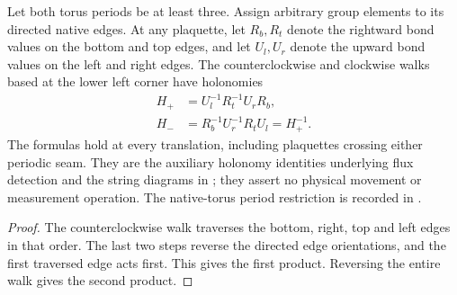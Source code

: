 \begin{lemma}%
    \label{thm:peps_torus_plaquette_holonomy}
    \leanok
    Let both torus periods be at least three. Assign arbitrary group
    elements to its directed native edges. At any plaquette, let $R_b,R_t$
    denote the rightward bond values on the bottom and top edges, and let
    $U_l,U_r$ denote the upward bond values on the left and right edges.
    The counterclockwise and clockwise walks based at the lower left
    corner have holonomies
    \begin{align}
        H_+ & = U_l^{-1}R_t^{-1}U_rR_b,          \\
        H_- & = R_b^{-1}U_r^{-1}R_tU_l=H_+^{-1}.
    \end{align}
    The formulas hold at every translation, including plaquettes crossing
    either periodic seam. They are the auxiliary holonomy identities
    underlying flux detection and the string diagrams in
    \cite[Theorem 6.15 and \S6.6]{Schuch2010PEPS}; they assert no physical
    movement or measurement operation.
    The native-torus period restriction is recorded in
    \cite{gap:rmp_peps_quantum_double_g_isometry}.
\end{lemma}

\begin{proof}\leanok
    The counterclockwise walk traverses the bottom, right, top and left
    edges in that order. The last two steps reverse the directed edge
    orientations, and the first traversed edge acts first. This gives the
    first product. Reversing the entire walk gives the second product.
\end{proof}
